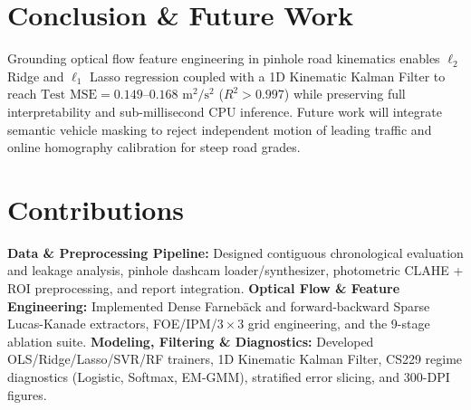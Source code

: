 \documentclass[10pt,twocolumn]{article}
\begin{document}
\begin{table}[t!]
\centering
\caption{Stratified Error Slicing on Contiguous Test Split (Ridge $\ell_2$).}
\label{tab:error_slices}
\footnotesize
\setlength{\tabcolsep}{2.5pt}
\end{table}

\section{Conclusion \& Future Work}
Grounding optical flow feature engineering in pinhole road kinematics enables $\ell_2$ Ridge and $\ell_1$ Lasso regression coupled with a 1D Kinematic Kalman Filter to reach $\text{Test MSE} = 0.149\text{--}0.168\text{ m}^2/\text{s}^2$ ($R^2 > 0.997$) while preserving full interpretability and sub-millisecond CPU inference. Future work will integrate semantic vehicle masking to reject independent motion of leading traffic and online homography calibration for steep road grades.

\section{Contributions}
\noindent\textbf{Data \& Preprocessing Pipeline:} Designed contiguous chronological evaluation and leakage analysis, pinhole dashcam loader/synthesizer, photometric CLAHE + ROI preprocessing, and report integration.  
\textbf{Optical Flow \& Feature Engineering:} Implemented Dense Farneb\"{a}ck and forward-backward Sparse Lucas-Kanade extractors, FOE/IPM/$3\times 3$ grid engineering, and the 9-stage ablation suite.  
\textbf{Modeling, Filtering \& Diagnostics:} Developed OLS/Ridge/Lasso/SVR/RF trainers, 1D Kinematic Kalman Filter, CS229 regime diagnostics (Logistic, Softmax, EM-GMM), stratified error slicing, and 300-DPI figures.
\end{document}
